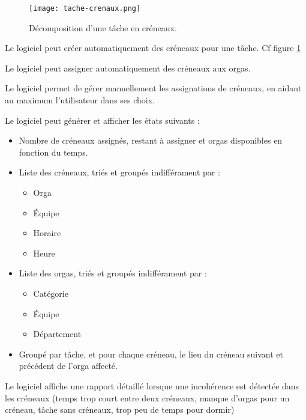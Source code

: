\begin{figure}[h!t]
\centering
\texttt{[image: tache-crenaux.png]}

\caption{Décomposition d'une tâche en créneaux.}
\label{fig:crenaux}
\end{figure}



Le logiciel peut créer automatiquement des créneaux pour une tâche. Cf figure \ref{fig:crenaux}

Le logiciel peut assigner automatiquement des créneaux aux orgas.

Le logiciel permet de gérer manuellement les assignations de créneaux, en aidant au maximum l'utilisateur dans ses choix.

Le logiciel peut générer et afficher les états suivants : 

\begin{itemize}
\item Nombre de créneaux assignés, restant à assigner et orgas disponibles en fonction du temps.
\item Liste des créneaux, triés et groupés indifférament par : 	\begin{itemize}
								  \item Orga
								  \item Équipe
								  \item Horaire
\item Heure
								 \end{itemize}
\item Liste des orgas, triés et groupés indifférament par :  	\begin{itemize}
								  \item Catégorie
								  \item Équipe
								  \item Département
								 \end{itemize}
\item Groupé par tâche, et pour chaque créneau, le lieu du créneau suivant et précédent de l'orga affecté.

\end{itemize}

Le logiciel affiche une rapport détaillé lorsque une incohérence est détectée dans les créneaux (temps trop court entre deux créneaux, manque d'orgas pour un créneau, tâche sans créneaux, trop peu de temps pour dormir)



